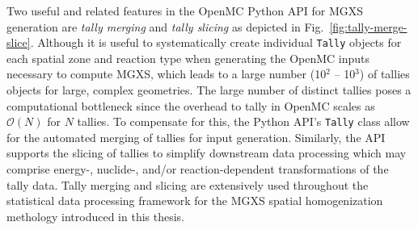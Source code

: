 Two useful and related features in the OpenMC Python \ac{API} for \ac{MGXS} generation are \textit{tally merging} and \textit{tally slicing} as depicted in Fig.~\ref{fig:tally-merge-slice}. Although it is useful to systematically create individual \texttt{Tally} objects for each spatial zone and reaction type when generating the OpenMC inputs necessary to compute \ac{MGXS}, which leads to a large number (10$^2$ -- 10$^3$) of tallies objects for large, complex geometries. The large number of distinct tallies poses a computational bottleneck since the overhead to tally in OpenMC scales as $\mathcal{O}(N)$ for $N$ tallies. To compensate for this, the Python \ac{API}'s \texttt{Tally} class allow for the automated merging of tallies for input generation. Similarly, the \ac{API} supports the slicing of tallies to simplify downstream data processing which may comprise energy-, nuclide-, and/or reaction-dependent transformations of the tally data. Tally merging and slicing are extensively used throughout the statistical data processing framework for the \ac{MGXS} spatial homogenization methology introduced in this thesis.

